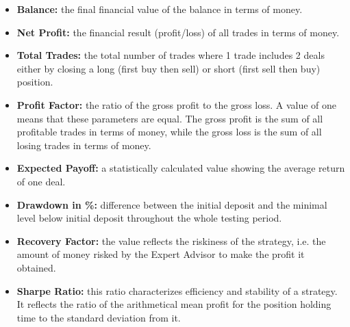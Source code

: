 \begin{itemize}
\setlength\itemsep{0.3em}
\item \textbf{Balance:} the final financial value of the balance in terms of money.
\item \textbf{Net Profit:} the financial result (profit/loss) of all trades in terms of money.
\item \textbf{Total Trades:} the total number of trades where 1 trade includes 2 deals either by closing a long (first buy then sell) or short (first sell then buy) position.
\item \textbf{Profit Factor:} the ratio of the gross profit to the gross loss. A value of one means that these parameters are equal. The gross profit is the sum of all profitable trades in terms of money, while the gross loss is the sum of all losing trades in terms of money.
\item \textbf{Expected Payoff:} a statistically calculated value showing the average return of one deal. 
\item \textbf{Drawdown in \%:} difference between the initial deposit and the minimal level below initial deposit throughout the whole testing period.
\item \textbf{Recovery Factor:} the value reflects the riskiness of the strategy, i.e. the amount of money risked by the Expert Advisor to make the profit it obtained.
\item \textbf{Sharpe Ratio:} this ratio characterizes efficiency and stability of a strategy. It reflects the ratio of the arithmetical mean profit for the position holding time to the standard deviation from it.
\end{itemize}





